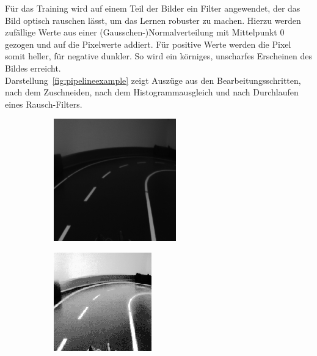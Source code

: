 Für das Training wird auf einem Teil der Bilder ein Filter angewendet, der das Bild optisch rauschen lässt, um das Lernen robuster zu machen. Hierzu werden zufällige Werte aus einer (Gausschen-)Normalverteilung mit Mittelpunkt 0 gezogen und auf die Pixelwerte addiert. Für positive Werte werden die Pixel somit heller, für negative dunkler. So wird ein körniges, unscharfes Erscheinen des Bildes erreicht.\\
Darstellung~\ref{fig:pipelineexample} zeigt Auszüge aus den Bearbeitungsschritten, nach dem Zuschneiden, nach dem Histogrammausgleich und nach Durchlaufen eines Rausch-Filters.

\begin{figure}[h]
	\centering
	\begin{subfigure}{.33\textwidth}
	\centering
		  \includegraphics[width=0.9\linewidth]{figures/200x200.png}
	 	  \caption{}
		  \label{fig:imagea}
	\end{subfigure}%
	\begin{subfigure}{.33\textwidth}
	\centering
		  \includegraphics[width=0.9\linewidth]{figures/200x200Hist.png}

\end{subfigure}
\end{figure}
